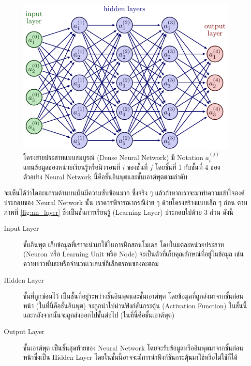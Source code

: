 \begin{figure}[H]
    \centering
    \includegraphics[width=0.7\linewidth]{fig/dense_neural_net.pdf}
    \caption{โครงข่ายประสาทแบบสมบูรณ์ (Dense Neural Network) มี Notation $a^{(j)}_{i}$ แทนข้อมูลของหน่วยเรียนรู้หรือนิวรอนที่ $i$ ของชั้นที่ $j$ โดยชั้นที่ 1 กับชั้นที่ 4 ของตัวอย่าง Neural Network นี้คือชั้นอินพุตและชั้นเอาต์พุตตามลำดับ}
    \label{fig:dense_neural_net}
\end{figure}

จะเห็นได้ว่าไดอะแกรมด้านบนนั้นมีความซับซ้อนมาก ซึ่งจริง ๆ แล้วถ้าหากเราจะมาทำความเข้าใจองค์ประกอบของ Neural Network นั้น เราควรพิจารณากรณีง่าย ๆ ด้วยโครงสร้างแบบเล็ก ๆ ก่อน ตามภาพที่ \ref{fig:nn_layer} ซึ่งเป็นชั้นการเรียนรู้ (Learning Layer) ประกอบไปด้วย 3 ส่วน ดังนี้

\begin{description}
    \item[Input Layer] ชั้นอินพุต เก็บข้อมูลที่เราจะนำมาใช้ในการฝึกสอนโมเดล โดยในแต่ละหน่วยประสาท (Neuron หรือ Learning Unit หรือ Node) จะเป็นตัวที่เก็บคุณลักษณ์ที่อยู่ในข้อมูล เช่น ความยาวพันธะหรือจำนวนเวเลนซ์อิเล็กตรอนของอะตอม

    \item[Hidden Layer] ชั้นที่ถูกซ่อนไว้ เป็นชั้นที่อยู่ระหว่างชั้นอินพุตและชั้นเอาต์พุต โดยข้อมูลที่ถูกส่งมาจากชั้นก่อนหน้า (ในที่นี้คือชั้นอินพุต) จะถูกนำไปผ่านฟังก์ชันกระตุ้น (Activation Function) ในชั้นนี้ และหลังจากนั้นจะถูกส่งออกไปชั้นต่อไป (ในที่นี้คือชั้นเอาต์พุต)

    \item[Output Layer] ชั้นเอาต์พุต เป็นชั้นสุดท้ายของ Neural Network โดยจะรับข้อมูลหรืออินพุตมาจากชั้นก่อนหน้าซึ่งเป็น Hidden Layer โดยในชั้นนี้อาจจะมีการนำฟังก์ชันกระตุ้นมาใช้หรือไม่ใช้ก็ได้
\end{description}

